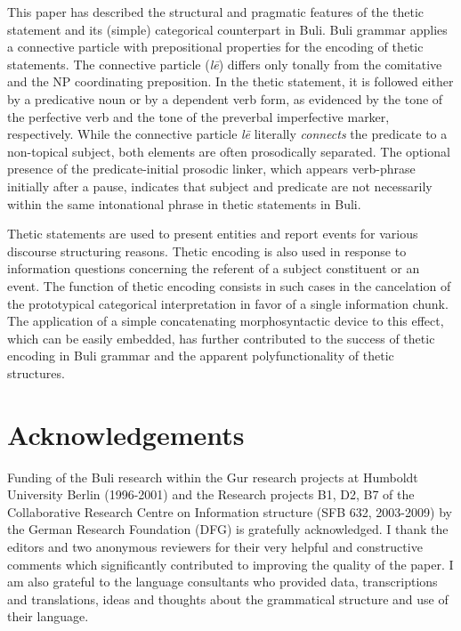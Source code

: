 \documentclass[output=paper]{langsci/langscibook}
\begin{document}
This paper has described the structural and pragmatic features of the thetic statement and its (simple) categorical counterpart in Buli. Buli grammar applies a connective particle with prepositional properties for the encoding of thetic statements. The connective particle (\textit{l\={e}}) differs only tonally from the comitative and the NP coordinating preposition. In the thetic statement, it is followed either by a predicative noun or by a dependent verb form, as evidenced by the tone of the perfective verb and the tone of the preverbal imperfective marker, respectively. While the connective particle\textit{ l\={e}} literally \textit{connects} the predicate to a non-topical subject, both elements are often prosodically separated. The optional presence of the predicate-initial prosodic linker, which appears verb-phrase initially after a pause, indicates that subject and predicate are not necessarily within the same intonational phrase in thetic statements in Buli. 

Thetic statements are used to present entities and report events for various discourse structuring reasons. Thetic encoding is also used in response to information questions concerning the referent of a subject constituent or an event. The function of thetic encoding consists in such cases in the cancelation of the prototypical categorical interpretation in favor of a single information chunk. The application of a simple concatenating morphosyntactic device to this effect, which can be easily embedded, has further contributed to the success of thetic encoding in Buli grammar and the apparent polyfunctionality of thetic structures. 

\section*{ Acknowledgements} 

Funding of the Buli research within the Gur research projects at Humboldt University Berlin (1996-2001) and the Research projects B1, D2, B7 of the Collaborative Research Centre on Information structure (SFB 632, 2003-2009) by the German Research Foundation (DFG) is gratefully acknowledged. I thank the editors and two anonymous reviewers for their very helpful and constructive comments which significantly contributed to improving the quality of the paper. I am also grateful to the language consultants who provided data, transcriptions and translations, ideas and thoughts about the grammatical structure and use of their language.
\end{document}
